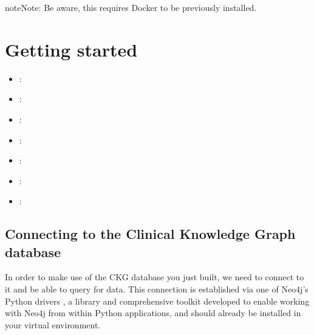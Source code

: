 \documentclass[letterpaper,10pt,english]{sphinxmanual}
\begin{document}
\begin{sphinxadmonition}{note}{Note:}
Be aware, this requires Docker to be previously installed.
\end{sphinxadmonition}


\chapter{Getting started}
\label{\detokenize{index:getting-started}}\begin{itemize}
\item {} 
:
{\hyperref[\detokenize{getting_started/connect-to-ckg::doc}]{}}

\item {} 
:
{\hyperref[\detokenize{getting_started/create-new-user::doc}]{}}

\item {} 
:
{\hyperref[\detokenize{getting_started/create-new-project::doc}]{}}

\item {} 
:
{\hyperref[\detokenize{getting_started/upload-data::doc}]{}}

\item {} 
:
{\hyperref[\detokenize{getting_started/data-analysis-config::doc}]{}}

\item {} 
:
{\hyperref[\detokenize{getting_started/access-report::doc}]{}}

\item {} 
:
{\hyperref[\detokenize{getting_started/notifications::doc}]{}}

\end{itemize}


\section{Connecting to the Clinical Knowledge Graph database}
\label{\detokenize{getting_started/connect-to-ckg:connecting-to-the-clinical-knowledge-graph-database}}\label{\detokenize{getting_started/connect-to-ckg::doc}}
In order to make use of the CKG database you just built, we need to connect to it and be able to query for data.
This connection is established via one of Neo4j’s Python drivers , a library and comprehensive toolkit developed to enable working with Neo4j from within Python applications, and should already be installed in your virtual environment.
\end{document}
